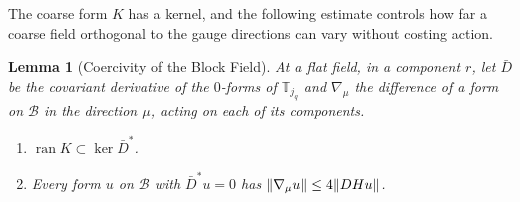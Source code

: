 \documentclass[11pt]{preprint}
\DeclarePairedDelimiter{\norm}{\lVert}{\rVert}
\numberwithin{equation}{section}
\newtheorem{lemma}[theorem]{Lemma}
\theoremstyle{definition}
\theoremstyle{remark}
\theoremstyle{plain}
\begin{document}
The coarse form $K$ has a kernel, and the following estimate controls how far a coarse field orthogonal to the gauge directions can vary without costing action.

\begin{lemma}[Coercivity of the Block Field]\label{lem:coarse-coercivity}
At a flat field, in a component $r$, let $\bar D$ be the covariant derivative of the $0$-forms of $\mathbb T_{j_q}$ and $\nabla_\mu$ the difference of a form on $\mathcal B$ in the direction $\mu$, acting on each of its components.
\begin{enumerate}[label=(\roman*)]
\item $\operatorname{ran}K \subset \ker\bar D^*$.
\item Every form $u$ on $\mathcal B$ with $\bar D^*u = 0$ has $\norm{\nabla_\mu u} \leq 4\norm{DHu}$.
\end{enumerate}
\end{lemma}
\end{document}
